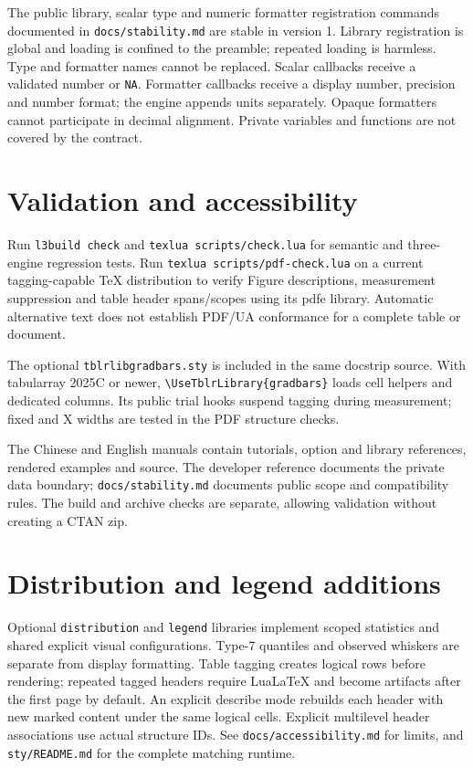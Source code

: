 The public library, scalar type and numeric formatter registration commands
documented in \texttt{docs/stability.md} are stable in version 1.
Library registration is global and loading is confined to the preamble;
repeated loading is harmless. Type and formatter names cannot be replaced.
Scalar callbacks receive a validated number or \texttt{NA}. Formatter
callbacks receive a display number, precision and number format; the engine
appends units separately. Opaque formatters cannot participate in decimal
alignment. Private variables and functions are not covered by the contract.

\section{Validation and accessibility}
Run \texttt{l3build check} and \texttt{texlua scripts/check.lua} for semantic
and three-engine regression tests. Run \texttt{texlua scripts/pdf-check.lua}
on a current tagging-capable TeX distribution to verify Figure descriptions,
measurement suppression and table header spans/scopes using its pdfe library. Automatic alternative text does not establish PDF/UA
conformance for a complete table or document.

The optional \texttt{tblrlibgradbars.sty} is included in the same docstrip
source. With tabularray 2025C or newer, \verb|\UseTblrLibrary{gradbars}| loads
cell helpers and dedicated columns. Its public trial hooks suspend tagging
during measurement; fixed and X widths are tested in the PDF structure checks.

The Chinese and English manuals contain tutorials, option and library
references, rendered examples and source. The developer reference documents
the private data boundary; \texttt{docs/stability.md} documents public scope
and compatibility rules. The build and archive checks are separate, allowing
validation without creating a CTAN zip.

\section{Distribution and legend additions}
Optional \texttt{distribution} and \texttt{legend} libraries implement scoped
statistics and shared explicit visual configurations. Type-7 quantiles and
observed whiskers are separate from display formatting. Table tagging creates
logical rows before rendering; repeated tagged headers require LuaLaTeX and
become artifacts after the first page by default. An explicit describe mode
rebuilds each header with new marked content under the same logical cells.
Explicit multilevel header associations use actual structure IDs. See \texttt{docs/accessibility.md} for
limits, and \texttt{sty/README.md} for the complete matching runtime.

